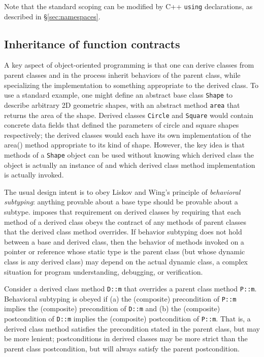 Note that the standard scoping can be modified by C++ \lstinline|using| declarations, as described in \S\ref{sec:namespaces}.


\subsection{Inheritance of function contracts}

A key aspect of object-oriented programming is 
that one can derive classes from parent classes and in 
the process inherit behaviors of the parent class, 
while specializing the implementation to something appropriate to the derived class. 
To use a standard example, 
one might define an abstract base class \lstinline|Shape| to describe arbitrary 2D geometric shapes, 
with an abstract method 
\lstinline|area| that returns the area of the shape. 
Derived classes \lstinline|Circle| and \lstinline|Square| would contain concrete data fields that defined the parameters of circle and square shapes respectively; 
the derived classes would each have its own implementation of the area() method appropriate to its kind of shape. 
However, the key idea is that methods of a \lstinline|Shape| object can be used without knowing which derived class the object is actually an instance of and
which derived class method implementation is actually invoked.

The usual design intent is to obey Liskov and Wing's principle of \textit{behavioral subtyping}\cite{Liskov:1994:BNS:197320.197383}: 
anything provable about a base type should be provable about a subtype.
\NAME imposes that requirement on derived classes by 
requiring that each method of a derived class obeys the contract of any methods of parent classes that the derived class method overrides. 
If behavior subtyping does not hold between a base and derived class, then the behavior of methods
invoked on a pointer or reference whose static type is the
parent class (but whose dynamic class is any derived class) may depend on the actual dynamic class, 
a complex situation for program understanding, debugging, or verification.

Consider a derived class method \lstinline|D::m| that overrides a parent class method \lstinline|P::m|.
Behavioral subtyping is obeyed if (a) the (composite) precondition of
\lstinline|P::m| implies the (composite) precondition of 
\lstinline|D::m| and (b) the (composite) postcondition of
\lstinline|D::m| implies the (composite) postcondition of 
\lstinline|P::m|. That is, a derived class method satisfies the precondition stated in the parent class, but may be more lenient; 
postconditions in derived classes may be more strict than the parent class postcondition, but will always 
satisfy the parent postcondition. 

